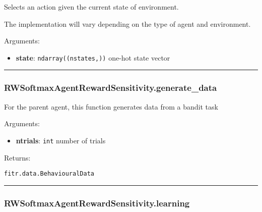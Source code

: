\begin{Shaded}
\begin{Highlighting}[]
\end{Highlighting}
\end{Shaded}

Selects an action given the current state of environment.

The implementation will vary depending on the type of agent and
environment.

Arguments:

\begin{itemize}
\tightlist
\item
  \textbf{state}: \texttt{ndarray((nstates,))} one-hot state vector
\end{itemize}

\begin{center}\rule{0.5\linewidth}{\linethickness}\end{center}

\subsubsection{RWSoftmaxAgentRewardSensitivity.generate\_data}\label{rwsoftmaxagentrewardsensitivity.generate_data}

\begin{Shaded}
\begin{Highlighting}[]
\end{Highlighting}
\end{Shaded}

For the parent agent, this function generates data from a bandit task

Arguments:

\begin{itemize}
\tightlist
\item
  \textbf{ntrials}: \texttt{int} number of trials
\end{itemize}

Returns:

\texttt{fitr.data.BehaviouralData}

\begin{center}\rule{0.5\linewidth}{\linethickness}\end{center}

\subsubsection{RWSoftmaxAgentRewardSensitivity.learning}\label{rwsoftmaxagentrewardsensitivity.learning}

